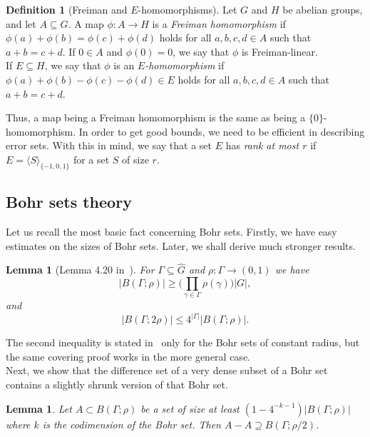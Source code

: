 \documentclass[a4paper,11pt]{article}
\numberwithin{theorem}{section}
\newtheorem{lemma}[theorem]{Lemma}
\theoremstyle{definition}
\newtheorem{defin}[theorem]{Definition}
\begin{document}
\begin{defin}[Freiman and $E$-homomorphisms]\label{FEhommDefin}
    Let $G$ and $H$ be abelian groups, and let $A \subseteq G$. A map $\phi : A \to H$ is a \textit{Freiman homomorphism} if $\phi(a) + \phi(b) = \phi(c) + \phi(d)$ holds for all $a, b, c, d \in A$ such that $a + b = c + d$. If $0 \in A$ and $\phi(0) = 0$, we say that $\phi$ is Freiman-linear.\\
    \indent If $E \subseteq H$, we say that $\phi$ is an \emph{$E$-homomorphism} if $\phi(a) + \phi(b) - \phi(c) - \phi(d) \in E$ holds for all $a,b, c,d \in A$ such that $a + b = c + d$.
\end{defin}

Thus, a map being a Freiman homomorphism is the same as being a $\{0\}$-homomorphism. In order to get good bounds, we need to be efficient in describing error sets. With this in mind, we say that a set $E$ has \textit{rank at most $r$} if $E = \langle S\rangle_{\{-1,0,1\}}$ for a set $S$ of size $r$.


\subsection{Bohr sets theory}

Let us recall the most basic fact concerning Bohr sets. Firstly, we have easy estimates on the sizes of Bohr sets. Later, we shall derive much stronger results.

\begin{lemma}[Lemma 4.20 in~\cite{TaoVuBook}]\label{basicbohrsizel}For $\Gamma \subseteq \hat{G}$ and $\rho : \Gamma \to (0,1)$ we have
\[|B(\Gamma; \rho)| \geq \Big( \prod_{\gamma \in \Gamma} \rho(\gamma) \Big) |G|,\]
and
\[|B(\Gamma; 2\rho)| \leq 4^{|\Gamma|}|B(\Gamma; \rho)|.\]
\end{lemma}

The second inequality is stated in~\cite{TaoVuBook} only for the Bohr sets of constant radius, but the same covering proof works in the more general case.\\

Next, we show that the difference set of a very dense subset of a Bohr set contains a slightly shrunk version of that Bohr set.

\begin{lemma}\label{almostfullBohr} Let $A \subset B(\Gamma; \rho)$ be a set of size at least $(1 - 4^{-k-1})|B(\Gamma; \rho)|$ where $k$ is the codimension of the Bohr set. Then $A - A \supseteq B(\Gamma; \rho/2)$.\end{lemma}
\end{document}
